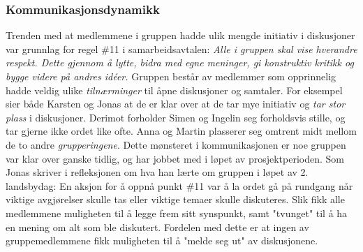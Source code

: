 \subsubsection{Kommunikasjonsdynamikk}

Trenden med at medlemmene i gruppen hadde ulik mengde initiativ i diskusjoner var grunnlag for regel \#11 i samarbeidsavtalen: \textit{Alle i gruppen skal vise hverandre respekt.
Dette gjennom å lytte, bidra med egne meninger, gi konstruktiv kritikk og bygge videre på andres id\'{e}er.} 
Gruppen består av medlemmer som opprinnelig hadde veldig ulike \textit{tilnærminger} til åpne diskusjoner og samtaler.
For eksempel sier både Karsten og Jonas at de er klar over at de tar mye initiativ og \textit{tar stor plass} i diskusjoner.
Derimot forholder Simen og Ingelin seg forholdsvis stille, og tar gjerne ikke ordet like ofte.
Anna og Martin plasserer seg omtrent midt mellom de to andre \textit{grupperingene}.
Dette mønsteret i kommunikasjonen er noe gruppen var klar over ganske tidlig, og har jobbet med i løpet av prosjektperioden.
Som Jonas skriver i refleksjonen om hva han lærte om gruppen i løpet av 2. landsbydag:
En aksjon for å oppnå punkt \#11 var å la ordet gå på rundgang når viktige avgjørelser skulle tas eller viktige temaer skulle diskuteres.
Slik fikk alle medlemmene muligheten til å legge frem sitt synspunkt, samt "tvunget" til å ha en mening om alt som ble diskutert.
Fordelen med dette er at ingen av gruppemedlemmene fikk muligheten til å "melde seg ut" av diskusjonene. \\

